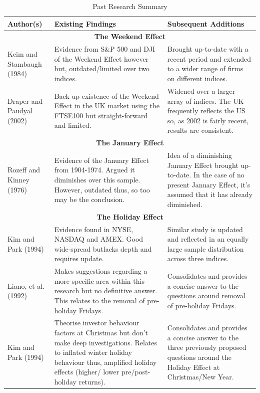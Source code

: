 \documentclass[11pt, english]{article}
\begin{document}
	\begin{table}[h]
		\scriptsize
		\renewcommand{\arraystretch}{1.25}
	\begin{center}
	\begin{tabular}{p{3.75cm}p{5cm}p{4.5cm}}
		\textbf{Author(s)} & \textbf{Existing Findings} & \textbf{Subsequent Additions}\\
		\hline
		\multicolumn{3}{c}{\textbf{The Weekend Effect}}\\
		\hline
		Keim and Stambaugh (1984) & Evidence from S\&P 500 and DJI of the Weekend Effect however but, outdated/limited over two indices. & Brought up-to-date with a recent period and extended to a wider range of firms on different indices.\\
		Draper and Paudyal (2002) & Back up existence of the Weekend Effect in the UK market using the FTSE100 but straight-forward and limited. & Widened over a larger array of indices. The UK frequently reflects the US so, as 2002 is fairly recent, results are consistent.\\
		\hline
		\multicolumn{3}{c}{\textbf{The January Effect}}\\
		\hline
		Rozeff and Kinney (1976) & Evidence of the January Effect from 1904-1974. Argued it diminishes over this sample. However, outdated thus, so too may be the conclusion. & Idea of a diminishing January Effect brought up-to-date. In the case of no present January Effect, it’s assumed that it has already diminished.\\
		\hline
		\multicolumn{3}{c}{\textbf{The Holiday Effect}}\\
		\hline
		Kim and Park (1994) & Evidence found in NYSE, NASDAQ and AMEX. Good wide-spread butlacks depth and requires update. & Similar study is updated and reflected in an equally large sample distribution across three indices.\\
		Liano, et al. (1992) & Makes suggestions regarding a more specific area within this research but no definitive answer. This relates to the removal of pre-holiday Fridays. & Consolidates and provides a concise answer to the questions around removal of pre-holiday Fridays.\\
		Kim and Park (1994) & Theorise investor behaviour factors at Christmas but don’t make deep investigations. Relates to inflated winter holiday behaviour thus, amplified holiday effects (higher/ lower pre/post-holiday returns). & Consolidates and provides a concise answer to the three previously proposed questions around the Holiday Effect at Christmas/New Year.\\
		\hline
	\end{tabular}
		\caption{Past Research Summary}
	\end{center}
	\end{table}
\end{document}
